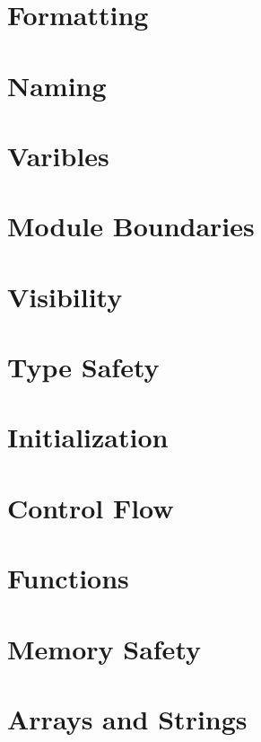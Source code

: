 \section{Formatting}


\section{Naming}


\section{Varibles}


\section{Module Boundaries}


\section{Visibility}


\section{Type Safety}


\section{Initialization}


\section{Control Flow}


\section{Functions}


\section{Memory Safety}


\section{Arrays and Strings}


